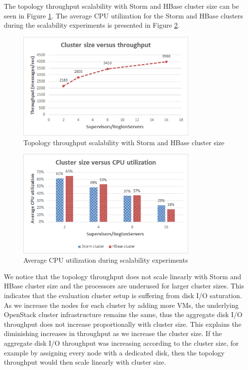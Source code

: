 The topology throughput scalability with Storm and HBase cluster size can be seen in Figure \ref{figure:benchmarks_storm_scalability_throughput}. The average CPU utilization for the Storm and HBase clusters during the scalability experiments is presented in Figure \ref{figure:benchmarks_storm_scalability_cpu}.

\begin{figure}[H]
\centering
\includegraphics[width=0.8\textwidth]{figures/benchmarks_storm_scalability_throughput}
\caption{Topology throughput scalability with Storm and HBase cluster size}
\label{figure:benchmarks_storm_scalability_throughput}
\end{figure}

\begin{figure}[H]
\centering
\includegraphics[width=0.8\textwidth]{figures/benchmarks_storm_scalability_cpu}
\caption{Average CPU utilization during scalability experiments}
\label{figure:benchmarks_storm_scalability_cpu}
\end{figure}

We notice that the topology throughput does not scale linearly with Storm and HBase cluster size and the processors are underused for larger cluster sizes. This indicates that the evaluation cluster setup is suffering from disk I/O saturation. As we increase the nodes for each cluster by adding more VMs, the underlying OpenStack cluster infrastructure remains the same, thus the aggregate disk I/O throughput does not increase proportionally with cluster size. This explains the diminishing increases in throughput as we increase the cluster size. If the aggregate disk I/O throughput was increasing according to the cluster size, for example by assigning every node with a dedicated disk, then the topology throughput would then scale linearly with cluster size.


